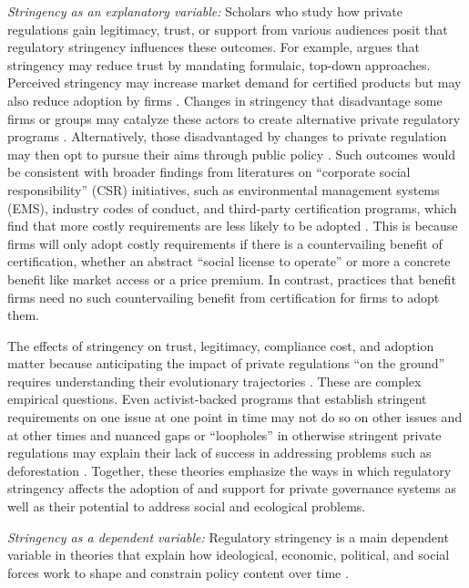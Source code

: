 \documentclass[
      12pt,
            Review ]{article}
\begin{document}
\emph{Stringency as an explanatory variable:} Scholars who study how private regulations gain legitimacy, trust, or support from various audiences posit that regulatory stringency influences these outcomes. For example, \citet{McDermott2012} argues that stringency may reduce trust by mandating formulaic, top-down approaches. Perceived stringency may increase market demand for certified products \citep{Atkinson2014} but may also reduce adoption by firms \citep{Prado2013}. Changes in stringency that disadvantage some firms or groups may catalyze these actors to create alternative private regulatory programs \citep{Meidinger2003}. Alternatively, those disadvantaged by changes to private regulation may then opt to pursue their aims through public policy \citep{Weimer2006}. Such outcomes would be consistent with broader findings from literatures on ``corporate social responsibility'' (CSR) initiatives, such as environmental management systems (EMS), industry codes of conduct, and third-party certification programs, which find that more costly requirements are less likely to be adopted \citep{Delmas2008, Kollman2001, Lyon2008}. This is because firms will only adopt costly requirements if there is a countervailing benefit of certification, whether an abstract ``social license to operate'' or more a concrete benefit like market access or a price premium. In contrast, practices that benefit firms need no such countervailing benefit from certification for firms to adopt them.

The effects of stringency on trust, legitimacy, compliance cost, and adoption matter because anticipating the impact of private regulations ``on the ground'' requires understanding their evolutionary trajectories \citep{VanderVen2018}. These are complex empirical questions. Even activist-backed programs that establish stringent requirements on one issue at one point in time may not do so on other issues and at other times \citep{LeBaron2018} and nuanced gaps or ``loopholes'' in otherwise stringent private regulations may explain their lack of success in addressing problems such as deforestation \citep{VanderVen2018}. Together, these theories emphasize the ways in which regulatory stringency affects the adoption of and support for private governance systems as well as their potential to address social and ecological problems.

\emph{Stringency as a dependent variable:} Regulatory stringency is a main dependent variable in theories that explain how ideological, economic, political, and social forces work to shape and constrain policy content over time \citep{Bartley2003, Cashore2004, Fischer2014}.
\end{document}
